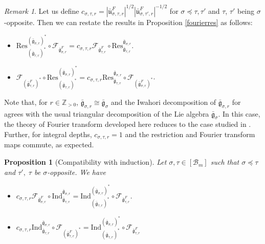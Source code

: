 \documentclass[11 pt]{article}
\numberwithin{equation}{subsection}
\newtheorem{proposition}[theorem]{Proposition}
\theoremstyle{definition}
\theoremstyle{remark}
\newtheorem{remark}[theorem]{Remark}
\theoremstyle{conjecture}
\newcommand{\bg}{\bar{\mathfrak g}}
\newcommand{\bu}{\bar{\mathfrak u}}
\newcommand{\Ind}{\mathrm{Ind}}
\newcommand{\Z}{\mathbb Z}
\newcommand{\mcF}{\mathcal F}
\newcommand{\B}{\mathcal{B}}
\begin{document}
\begin{remark}\label{csigmataur}
    Let us define $c_{\sigma,\tau,r} = \left|\bu_{\sigma,\tau,r}^F\right|^{1/2}\left|\bu_{\sigma,\tau',r}^F\right|^{-1/2}$ for $\sigma \preceq\tau,\tau'$ and $\tau$, $\tau'$ being $\sigma$-opposite. Then we can restate the results in Proposition \ref{fourierres} as follows:
     \begin{itemize}
        \item [(i)] $ \mathrm{Res}^{(\bg_{\sigma,r})^*}_{(\bg_{\tau,r})^*} \circ \mcF_{\bg_{\sigma,r}^F} = c_{\sigma,\tau,r} \mcF_{\bg_{\tau,r}^F} \circ \mathrm{Res}^{\bg_{\sigma,r}}_{\bg_{\tau,r}} $.
        \item[(ii)] $\mcF_{(\bg_{\tau,r}^F)^*}\circ \mathrm{Res}^{(\bg_{\sigma,r})^*}_{(\bg_{\tau,r})^*}= c_{\sigma,\tau,r}\mathrm{Res}^{\bg_{\sigma,r}}_{\bg_{\tau,r}} \circ \mcF_{(\bg_{\sigma,r}^F)^*}$. 
    \end{itemize}
    Note that, for $r \in \Z_{>0}$, $\bg_{\sigma,r} \cong \bg_\sigma$ and the Iwahori decomposition of $\bg_{\sigma,r}$ for agrees with the usual triangular decomposition of the Lie algebra $\bg_\sigma$. In this case, the theory of Fourier transform developed here reduces to the case studied in \cite{Le}. Further, for integral depths, $c_{\sigma,\tau,r}=1$ and the restriction and Fourier transform maps commute, as expected. 
\end{remark}
\begin{proposition}[Compatibility with induction]
     Let $\sigma, \tau \in [\B_m]$ such that $\sigma \preceq \tau$ and $\tau',\;\tau $ be $\sigma$-opposite. We have 
     \begin{itemize}
         \item [(i)]$c_{\sigma,\tau,r}\mcF_{\bg_{\sigma,r}^F} \circ \Ind^{\bg_{\sigma,r}}_{\bg_{\tau,r}} = \Ind^{(\bg_{\sigma,r})^*}_{(\bg_{\tau,r})^*} \circ \mcF_{\bg_{\tau,r}^F}$.
         \item[(ii)] $ c_{\sigma,\tau,r} \Ind^{\bg_{\sigma,r}}_{\bg_{\tau,r}}\circ \mcF_{(\bg_{\tau,r}^F)^*}= \Ind^{(\bg_{\sigma,r})^*}_{(\bg_{\tau,r})^*} \circ \mcF_{\bg_{\tau,r}^F}$
     \end{itemize}
\end{proposition}
\end{document}
